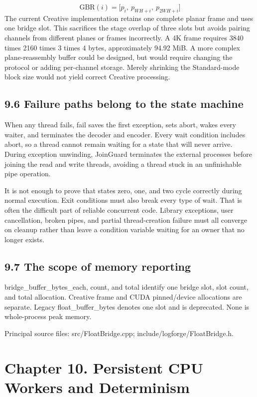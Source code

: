 \documentclass[11pt,a4paper,openany]{book}
\begin{document}
\begin{equation}
\mathrm{GBR}(i)=\bigl[p_i,\ p_{WH+i},\ p_{2WH+i}\bigr]
\end{equation}
The current Creative implementation retains one complete planar frame and uses one bridge slot. This sacrifices the stage overlap of three slots but avoids pairing channels from different planes or frames incorrectly. A 4K frame requires 3840 times 2160 times 3 times 4 bytes, approximately 94.92 MiB. A more complex plane-reassembly buffer could be designed, but would require changing the protocol or adding per-channel storage. Merely shrinking the Standard-mode block size would not yield correct Creative processing.


\section*{9.6 Failure paths belong to the state machine}
When any thread fails, fail saves the first exception, sets abort, wakes every waiter, and terminates the decoder and encoder. Every wait condition includes abort, so a thread cannot remain waiting for a state that will never arrive. During exception unwinding, JoinGuard terminates the external processes before joining the read and write threads, avoiding a thread stuck in an unfinishable pipe operation.

It is not enough to prove that states zero, one, and two cycle correctly during normal execution. Exit conditions must also break every type of wait. That is often the difficult part of reliable concurrent code. Library exceptions, user cancellation, broken pipes, and partial thread-creation failure must all converge on cleanup rather than leave a condition variable waiting for an owner that no longer exists.


\section*{9.7 The scope of memory reporting}
bridge\_buffer\_bytes\_each, count, and total identify one bridge slot, slot count, and total allocation. Creative frame and CUDA pinned/device allocations are separate. Legacy float\_buffer\_bytes denotes one slot and is deprecated. None is whole-process peak memory.


\par\small Principal source files: src/FloatBridge.cpp; include/logforge/FloatBridge.h.\normalsize

\chapter*{Chapter 10. Persistent CPU Workers and Determinism}
\end{document}
